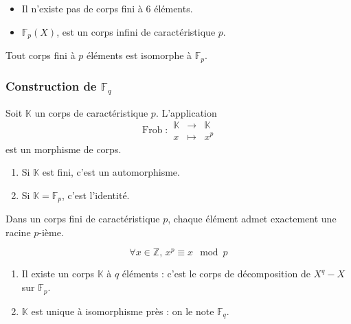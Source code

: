   \begin{example}
    \begin{itemize}
      \item Il n'existe pas de corps fini à $6$ éléments.
      \item $\mathbb{F}_p(X)$, est un corps infini de caractéristique $p$.
    \end{itemize}
  \end{example}


  \begin{proposition}
    Tout corps fini à $p$ éléments est isomorphe à $\mathbb{F}_p$.
  \end{proposition}

  \subsubsection{Construction de \texorpdfstring{$\mathbb{F}_q$}{Fq}}


  \begin{proposition}
    Soit $\mathbb{K}$ un corps de caractéristique $p$. L'application
    \[
    \operatorname{Frob} :
    \begin{array}{ccc}
      \mathbb{K} &\rightarrow& \mathbb{K} \\
      x &\mapsto& x^p
    \end{array}
    \]
    est un morphisme de corps.
    \begin{enumerate}[label={\bfseries(\roman*)}]
      \item Si $\mathbb{K}$ est fini, c'est un automorphisme.
      \item Si $\mathbb{K} = \mathbb{F}_p$, c'est l'identité.
    \end{enumerate}
  \end{proposition}

  \begin{corollary}
    Dans un corps fini de caractéristique $p$, chaque élément admet exactement une racine $p$-ième.
  \end{corollary}

  \begin{application}
    \[ \forall x \in \mathbb{Z}, \, x^p \equiv x \mod p \]
  \end{application}

  \begin{theorem}
    \begin{enumerate}[label={\bfseries(\roman*)}]
      \item Il existe un corps $\mathbb{K}$ à $q$ éléments : c'est le corps de décomposition de $X^q - X$ sur $\mathbb{F}_p$.
      \item $\mathbb{K}$ est unique à isomorphisme près : on le note $\mathbb{F}_q$.
    \end{enumerate}
  \end{theorem}

